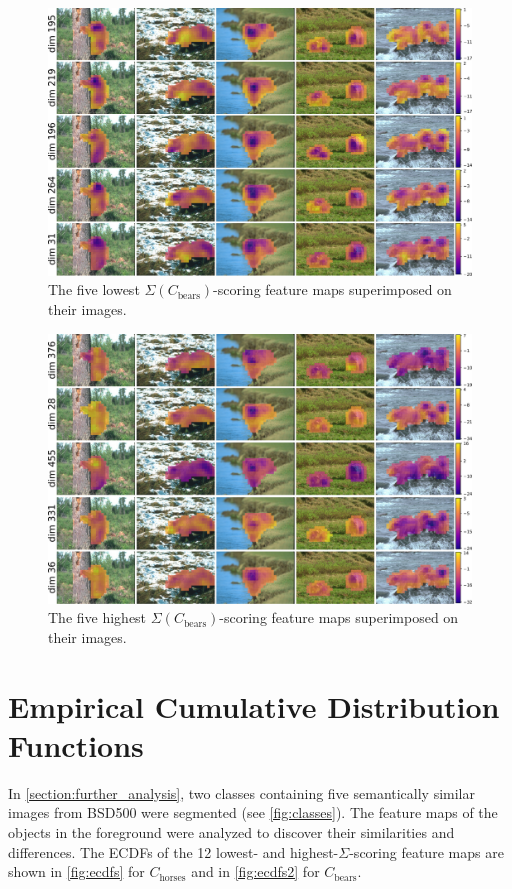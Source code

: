 \begin{figure}
    \centering
    \includegraphics[width=.9\textwidth]{figures/overlayed_dim_similar2.pdf}
    \caption{The five lowest $\Sigma(C_{\text{bears}})$-scoring feature maps superimposed on their images.}
    \label{fig:overlay_similar_dims2}
\end{figure}

\begin{figure}
    \centering
    \includegraphics[width=.9\textwidth]{figures/overlayed_dim_dissimilar2.pdf}
    \caption{The five highest $\Sigma(C_{\text{bears}})$-scoring feature maps superimposed on their images.}
    \label{fig:overlay_dissimilar_dims2}
\end{figure}

\section{Empirical Cumulative Distribution Functions}

In \autoref{section:further_analysis}, two classes containing five semantically similar images from BSD500 were segmented (see \autoref{fig:classes}).
The feature maps of the objects in the foreground were analyzed to discover their similarities and differences. The ECDFs of the 12 lowest- and highest-$\Sigma$-scoring feature maps are shown in \autoref{fig:ecdfs} for $C_{\text{horses}}$ and in \autoref{fig:ecdfs2} for $C_{\text{bears}}$.

